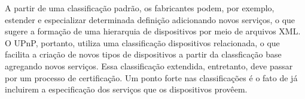 A partir de uma classificação padrão, os fabricantes podem, por exemplo, estender e especializar determinada definição adicionando novos serviços, o que sugere a formação de uma hierarquia de dispositivos por meio de arquivos XML. O UPnP, portanto, utiliza uma classificação dispositivos relacionada, o que facilita a criação de novos tipos de dispositivos a partir da classficação base agregando novos serviços. Essa classificação extendida, entretanto, deve passar por um processo de certificação. Um ponto forte nas classificações é o fato de já incluirem a especificação dos serviços que os dispositivos provêem.
